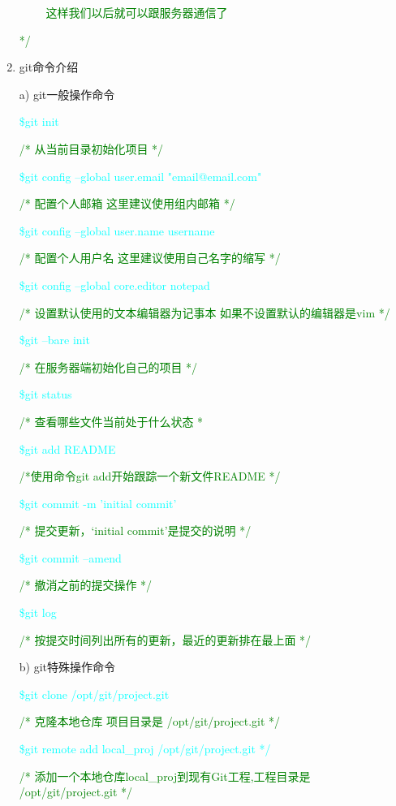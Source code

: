 \begin{enumerate}
~~~~\textcolor{green}{   这样我们以后就可以跟服务器通信了 }

\textcolor{green}{ */}

\item git命令介绍

a) git一般操作命令

\textcolor{cyan}{\$git init}

\textcolor{green}{/* 从当前目录初始化项目 */}

\textcolor{cyan}{\$git config --global user.email "email@email.com" }

\textcolor{green}{/* 配置个人邮箱 这里建议使用组内邮箱 */}

\textcolor{cyan}{\$git config --global user.name username}

\textcolor{green}{/* 配置个人用户名 这里建议使用自己名字的缩写 */}

\textcolor{cyan}{\$git config --global core.editor notepad}

\textcolor{green}{/* 设置默认使用的文本编辑器为记事本 如果不设置默认的编辑器是vim */}
 
\textcolor{cyan}{\$git --bare init }

\textcolor{green}{/* 在服务器端初始化自己的项目 */}

\textcolor{cyan}{\$git status }

\textcolor{green}{/* 查看哪些文件当前处于什么状态 *}

\textcolor{cyan}{\$git add README }

\textcolor{green}{/*使用命令git add开始跟踪一个新文件README */}

\textcolor{cyan}{\$git commit -m 'initial commit'}

\textcolor{green}{/* 提交更新，‘initial commit’是提交的说明 */}

\textcolor{cyan}{\$git commit --amend}

\textcolor{green}{/* 撤消之前的提交操作 */}

\textcolor{cyan}{\$git log}

\textcolor{green}{/* 按提交时间列出所有的更新，最近的更新排在最上面 */}


b) git特殊操作命令

\textcolor{cyan}{\$git clone /opt/git/project.git}

\textcolor{green}{/* 克隆本地仓库 项目目录是 /opt/git/project.git */}

\textcolor{cyan}{\$git remote add local\_proj /opt/git/project.git */}

\textcolor{green}{/* 添加一个本地仓库local\_proj到现有Git工程,工程目录是 /opt/git/project.git */}


\end{enumerate}
